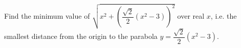 Find the minimum value of $\sqrt{x^2+\left(\dfrac{\sqrt2}{2}\left(x^2-3\right)\right)^2}$ over real $x$, i.e. the smallest distance from the origin to the parabola $y=\dfrac{\sqrt2}{2}\left(x^2-3\right)$.
